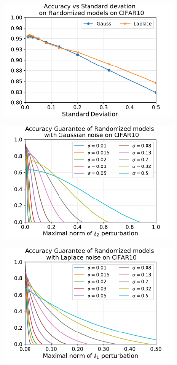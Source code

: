 \begin{figure}[htb]
  \centering
  \begin{subfigure}[t]{0.31\textwidth}
      \centering
      \includegraphics[scale=0.32]{figures/appendix2/acc_sd_CIFAR10.pdf}
      \caption{}
      \label{figure:ap2-acc_sd_CIFAR10}
  \end{subfigure}
  \begin{subfigure}[t]{0.31\textwidth}
      \centering
      \includegraphics[scale=0.32]{figures/appendix2/gauss_certif_CIFAR10.pdf}
      \caption{}
      \label{figure:ap2-gauss_certif_CIFAR10}
  \end{subfigure}
  \begin{subfigure}[t]{0.31\textwidth}
      \centering
      \includegraphics[scale=0.32]{figures/appendix2/laplace_certif_CIFAR10.pdf}

\end{subfigure}
\end{figure}
